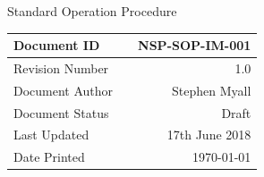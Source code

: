 \documentclass[a4paper,10pt]{article}
\begin{document}
\begin{titlepage}
	          \vspace*{2.5 cm}

            {\huge Standard Operation Procedure}\\[0.5 cm]	%
	        
	        \vspace*{4.0 cm}
	   


  \begin{tabular}{ |l c r |}                                       \hline
    
    Document ID         & \hspace*{4.5 cm}  &   NSP-SOP-IM-001   \\ \hline
    
    Revision Number     & \hspace*{4.5 cm}  &   1.0             \\ \hline
    
    Document Author     & \hspace*{4.5 cm}  &   Stephen Myall   \\ \hline
    
    Document Status     & \hspace*{4.5 cm}  &   Draft           \\ \hline
    
    Last Updated        & \hspace*{4.5 cm}  &   17th June 2018  \\ \hline
    
    Date Printed        & \hspace*{4.5 cm}  &   \today          \\ \hline
   
   \end{tabular}

  \end{titlepage} 
	


\tableofcontents %
\thispagestyle{empty}  %
\pagebreak %
\setcounter{page}{1} %
\end{document}
